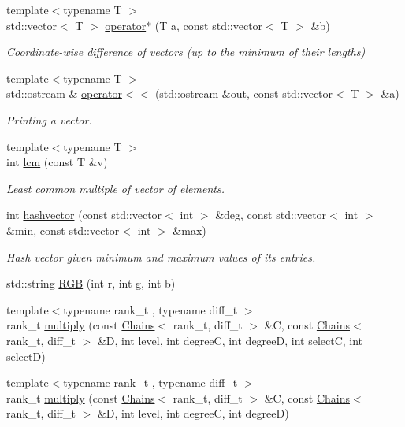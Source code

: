 \begin{DoxyCompactItemize}
{\footnotesize template$<$typename T $>$ }\\std\+::vector$<$ T $>$ \hyperlink{namespaceMackey_ae235ee5dd92dc1ca64388b8fbb1b4d75}{operator$\ast$} (T a, const std\+::vector$<$ T $>$ \&b)
\begin{DoxyCompactList}\small\item\em Coordinate-\/wise difference of vectors (up to the minimum of their lengths) \end{DoxyCompactList}\item 
{\footnotesize template$<$typename T $>$ }\\std\+::ostream \& \hyperlink{namespaceMackey_aa4da3e3b46b9cb20f3be57d7e5da2d5d}{operator$<$$<$} (std\+::ostream \&out, const std\+::vector$<$ T $>$ \&a)
\begin{DoxyCompactList}\small\item\em Printing a vector. \end{DoxyCompactList}\item 
{\footnotesize template$<$typename T $>$ }\\int \hyperlink{namespaceMackey_a5d8ae76ffb9440e27bfca124d26ee1b2}{lcm} (const T \&v)
\begin{DoxyCompactList}\small\item\em Least common multiple of vector of elements. \end{DoxyCompactList}\item 
int \hyperlink{namespaceMackey_ae57418329a761aa68d26d68b637fe9dd}{hashvector} (const std\+::vector$<$ int $>$ \&deg, const std\+::vector$<$ int $>$ \&min, const std\+::vector$<$ int $>$ \&max)
\begin{DoxyCompactList}\small\item\em Hash vector given minimum and maximum values of its entries. \end{DoxyCompactList}\item 
std\+::string \hyperlink{namespaceMackey_a12645e850e7965ee23d47e00ac7affdf}{R\+GB} (int r, int g, int b)
\item 
{\footnotesize template$<$typename rank\+\_\+t , typename diff\+\_\+t $>$ }\\rank\+\_\+t \hyperlink{namespaceMackey_a80dbde3a859378ede596b48869ec50d9}{multiply} (const \hyperlink{classMackey_1_1Chains}{Chains}$<$ rank\+\_\+t, diff\+\_\+t $>$ \&C, const \hyperlink{classMackey_1_1Chains}{Chains}$<$ rank\+\_\+t, diff\+\_\+t $>$ \&D, int level, int degreeC, int degreeD, int selectC, int selectD)
\item 
{\footnotesize template$<$typename rank\+\_\+t , typename diff\+\_\+t $>$ }\\rank\+\_\+t \hyperlink{namespaceMackey_a2eca4cc709501ad3fc20b82fe4bcbd33}{multiply} (const \hyperlink{classMackey_1_1Chains}{Chains}$<$ rank\+\_\+t, diff\+\_\+t $>$ \&C, const \hyperlink{classMackey_1_1Chains}{Chains}$<$ rank\+\_\+t, diff\+\_\+t $>$ \&D, int level, int degreeC, int degreeD)

\end{DoxyCompactItemize}
